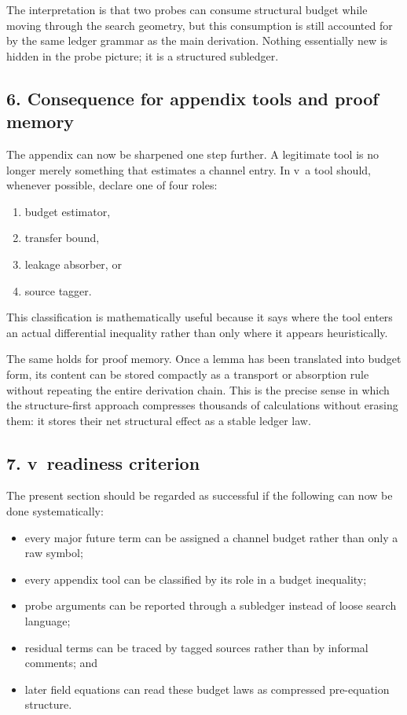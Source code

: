The interpretation is that two probes can consume structural budget while moving
through the search geometry, but this consumption is still accounted for by the
same ledger grammar as the main derivation. Nothing essentially new is hidden in
the probe picture; it is a structured subledger.

\subsection*{6. Consequence for appendix tools and proof memory}
The appendix can now be sharpened one step further. A legitimate tool is no longer
merely something that estimates a channel entry. In v\docversion\ a tool should,
whenever possible, declare one of four roles:
\begin{enumerate}[label=(\alph*)]
  \item budget estimator,
  \item transfer bound,
  \item leakage absorber, or
  \item source tagger.
\end{enumerate}
This classification is mathematically useful because it says where the tool enters
an actual differential inequality rather than only where it appears heuristically.

The same holds for proof memory. Once a lemma has been translated into budget form,
its content can be stored compactly as a transport or absorption rule without
repeating the entire derivation chain. This is the precise sense in which the
structure-first approach compresses thousands of calculations without erasing them:
it stores their net structural effect as a stable ledger law.

\subsection*{7. v\docversion\ readiness criterion}
The present section should be regarded as successful if the following can now be
done systematically:
\begin{itemize}
  \item every major future term can be assigned a channel budget rather than only a raw symbol;
  \item every appendix tool can be classified by its role in a budget inequality;
  \item probe arguments can be reported through a subledger instead of loose search language;
  \item residual terms can be traced by tagged sources rather than by informal comments; and
  \item later field equations can read these budget laws as compressed pre-equation structure.
\end{itemize}


